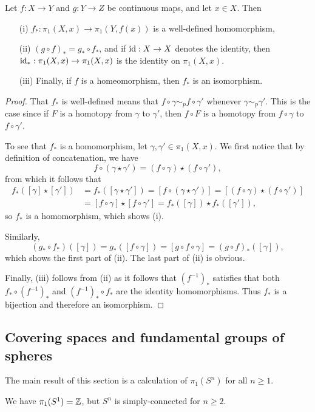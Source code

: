 \begin{thm}
  Let $f : X \to Y$ and $g : Y \to Z$ be continuous maps, and let $x \in X$. Then
  \begin{itemize}
    \item[(i)] $f_*: \pi_1(X,x) \to \pi_1(Y,f(x))$ is a well-defined homomorphism,
    \item[(ii)] $(g \circ f)_* = g_* \circ f_*$, and if $\mathrm{id} : X \to X$ denotes the identity, then $\mathrm{id}_* : \pi_1(X,x) \to \pi_1(X,x)$ is the identity on $\pi_1(X,x)$.
    \item[(iii)] Finally, if $f$ is a homeomorphism, then $f_*$ is an isomorphism.
  \end{itemize}
\end{thm}
\begin{proof}
  That $f_*$ is well-defined means that $f \circ \gamma \sim_p f \circ \gamma'$ whenever $\gamma \sim_p \gamma'$. This is the case since if $F$ is a homotopy from $\gamma$ to $\gamma'$, then $f \circ F$ is a homotopy from $f \circ \gamma$ to $f \circ \gamma'$.
  
  To see that $f_*$ is a homomorphism, let $\gamma, \gamma' \in \pi_1(X,x)$. We first notice that by definition of concatenation, we have
  \[
    f \circ ( \gamma \star \gamma') = (f \circ \gamma) \star (f \circ \gamma'),
  \]
  from which it follows that
  \begin{align*}
    f_*([\gamma] \star [\gamma']) &= f_*([\gamma \star \gamma']) = [f \circ (\gamma \star \gamma')] = [(f \circ \gamma) \star (f \circ \gamma')] \\
      &= [ f \circ \gamma] \star [f \circ \gamma'] = f_*([\gamma]) \star f_*([\gamma']),
  \end{align*}
  so $f_*$ is a homomorphism, which shows (i).
  
  Similarly,
  \[
    (g_* \circ f_*)([\gamma]) = g_* ( [f \circ \gamma]) = [g \circ f \circ \gamma] = (g \circ f)_*([\gamma]),
  \]
  which shows the first part of (ii). The last part of (ii) is obvious.
  
  Finally, (iii) follows from (ii) as it follows that $(f^{-1})_*$ satisfies that both $f_* \circ (f^{-1})_*$ and $(f^{-1})_* \circ f_*$ are the identity homomorphisms. Thus $f_*$ is a bijection and therefore an isomorphism.
\end{proof} 

\subsection{Covering spaces and fundamental groups of spheres}
The main result of this section is a calculation of $\pi_1(S^n)$ for all $n \geq 1$.
\begin{thm}
  \label{fundamental-group-of-spheres}
  We have $\pi_1(S^1) = \mathbb{Z}$, but $S^n$ is simply-connected for $n \geq 2$.
\end{thm}

